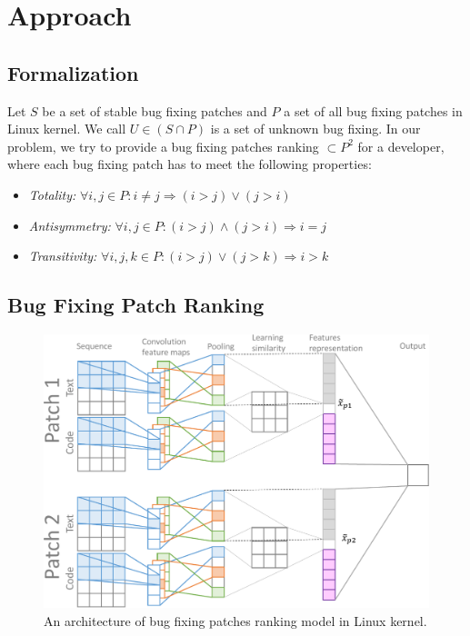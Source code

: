 \section{Approach}
\label{sec:approach}
\subsection{Formalization}
\label{sec:formalization}

Let $S$ be a set of stable bug fixing patches and $P$ a set of all bug fixing patches in Linux kernel. We call $U \in (S \cap P ) $ is a set of unknown bug fixing. In our problem, we try to provide a bug fixing patches ranking $\subset P^2$ for a developer, where each bug fixing patch has to meet the following properties:
\begin{itemize}
	\item \textit{Totality:} $\forall i,j \in P: i \neq j \Rightarrow (i > j) \vee (j > i)$
	\item \textit{Antisymmetry:} $\forall i,j \in P: (i > j) \wedge (j > i) \Rightarrow i = j$ 
	\item \textit{Transitivity:} $\forall i,j,k \in P: (i > j) \vee (j > k) \Rightarrow i > k$ 
\end{itemize}

\subsection{Bug Fixing Patch Ranking}
\label{sec:bugranking}
\begin{figure}[t!]
	\centering
	\includegraphics[width=1.0\textwidth]{BugPatchingRanking-cropped.pdf}
	\caption{An architecture of bug fixing patches ranking model in Linux kernel.}
	\label{fig:bugranking}
\end{figure}

